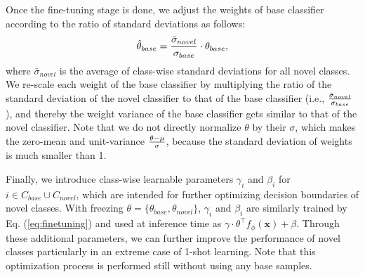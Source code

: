 Once the fine-tuning stage is done, we adjust the weights of base classifier according to the ratio of standard deviations as follows:
\begin{equation}
\begin{aligned}
  \hat \theta_{base} &= {\bar \sigma_{novel} \over \sigma_{base}} \cdot \theta_{base}, \\
\end{aligned}
\end{equation}
where $\bar \sigma_{novel}$ is the average of class-wise standard deviations for all novel classes. We re-scale each weight of the base classifier by multiplying the ratio of the standard deviation of the novel classifier to that of the base classifier (i.e., $\bar \sigma_{novel} \over \sigma_{base}$), and thereby the weight variance of the base classifier gets similar to that of the novel classifier. Note that we do not directly normalize $\theta$ by their $\sigma$, which makes the zero-mean and unit-variance ${\theta - \mu \over \sigma}$, because the standard deviation of weights is much smaller than 1.









Finally, we introduce class-wise learnable parameters $\gamma_i$ and $\beta_i$ for $i \in C_{base} \cup C_{novel}$, which are intended for further optimizing decision boundaries of novel classes. With freezing $\theta = \{\theta_{base}, \theta_{novel}\}$, $\gamma_i$ and $\beta_i$ are similarly trained by Eq. (\ref{eq:finetuning}) and used at inference time as $\gamma \cdot \theta^\top f_\phi(\mathbf{x}) + \beta$. Through these additional parameters, we can further improve the performance of novel classes particularly in an extreme case of 1-shot learning. Note that this optimization process is performed still without using any base samples.































